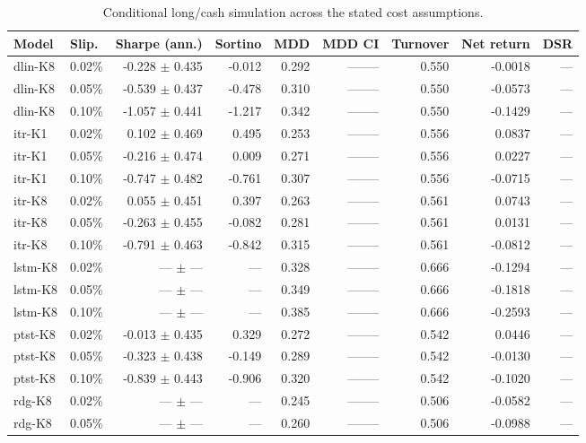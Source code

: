 \begin{table}[!t]
\centering
\caption{Conditional long/cash simulation across the stated cost assumptions.}
\label{tab:economics}
\begin{tabular}{llrrrrrrr}
\toprule
Model & Slip. & Sharpe (ann.) & Sortino & MDD & MDD CI & Turnover & Net return & DSR \\
\midrule
dlin-K8 & 0.02\% & -0.228 $\pm$ 0.435 & -0.012 & 0.292 & -------- & 0.550 & -0.0018 & --- \\
dlin-K8 & 0.05\% & -0.539 $\pm$ 0.437 & -0.478 & 0.310 & -------- & 0.550 & -0.0573 & --- \\
dlin-K8 & 0.10\% & -1.057 $\pm$ 0.441 & -1.217 & 0.342 & -------- & 0.550 & -0.1429 & --- \\
itr-K1 & 0.02\% & 0.102 $\pm$ 0.469 & 0.495 & 0.253 & -------- & 0.556 & 0.0837 & --- \\
itr-K1 & 0.05\% & -0.216 $\pm$ 0.474 & 0.009 & 0.271 & -------- & 0.556 & 0.0227 & --- \\
itr-K1 & 0.10\% & -0.747 $\pm$ 0.482 & -0.761 & 0.307 & -------- & 0.556 & -0.0715 & --- \\
itr-K8 & 0.02\% & 0.055 $\pm$ 0.451 & 0.397 & 0.263 & -------- & 0.561 & 0.0743 & --- \\
itr-K8 & 0.05\% & -0.263 $\pm$ 0.455 & -0.082 & 0.281 & -------- & 0.561 & 0.0131 & --- \\
itr-K8 & 0.10\% & -0.791 $\pm$ 0.463 & -0.842 & 0.315 & -------- & 0.561 & -0.0812 & --- \\
lstm-K8 & 0.02\% & --- $\pm$ --- & --- & 0.328 & -------- & 0.666 & -0.1294 & --- \\
lstm-K8 & 0.05\% & --- $\pm$ --- & --- & 0.349 & -------- & 0.666 & -0.1818 & --- \\
lstm-K8 & 0.10\% & --- $\pm$ --- & --- & 0.385 & -------- & 0.666 & -0.2593 & --- \\
ptst-K8 & 0.02\% & -0.013 $\pm$ 0.435 & 0.329 & 0.272 & -------- & 0.542 & 0.0446 & --- \\
ptst-K8 & 0.05\% & -0.323 $\pm$ 0.438 & -0.149 & 0.289 & -------- & 0.542 & -0.0130 & --- \\
ptst-K8 & 0.10\% & -0.839 $\pm$ 0.443 & -0.906 & 0.320 & -------- & 0.542 & -0.1020 & --- \\
rdg-K8 & 0.02\% & --- $\pm$ --- & --- & 0.245 & -------- & 0.506 & -0.0582 & --- \\
rdg-K8 & 0.05\% & --- $\pm$ --- & --- & 0.260 & -------- & 0.506 & -0.0988 & --- \\

\end{tabular}
\end{table}
